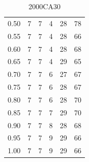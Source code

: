 \documentclass[review]{elsarticle}
\begin{document}
\begin{table}[H]
\begin{subtable}[h]{0.45\textwidth}
{\begin{tabular}{@{}>{\Large}c>{\Large}c>{\Large}c>{\Large}c>{\Large}c>{\Large}c@{}}
			0.50 & 7 & 7 & 4 & 28 & 78 \\
			0.55 & 7 & 7 & 4 & 28 & 66 \\
			0.60 & 7 & 7 & 4 & 28 & 68 \\
			0.65 & 7 & 7 & 4 & 29 & 65 \\
			0.70 & 7 & 7 & 6 & 27 & 67 \\
			0.75 & 7 & 7 & 6 & 28 & 67 \\
			0.80 & 7 & 7 & 6 & 28 & 70 \\
			0.85 & 7 & 7 & 7 & 29 & 70 \\
			0.90 & 7 & 7 & 8 & 28 & 68 \\
			0.95 & 7 & 7 & 9 & 29 & 66 \\
			1.00 & 7 & 7 & 9 & 29 & 66 \\
        \end{tabular}
        }
        \caption{2000CA30}
        \label{tab:2000CA30_hmax}
    \end{subtable}
    \hfill
    \begin{subtable}[h]{0.45\textwidth}
        \centering
\end{subtable}
\end{table}
\end{document}
